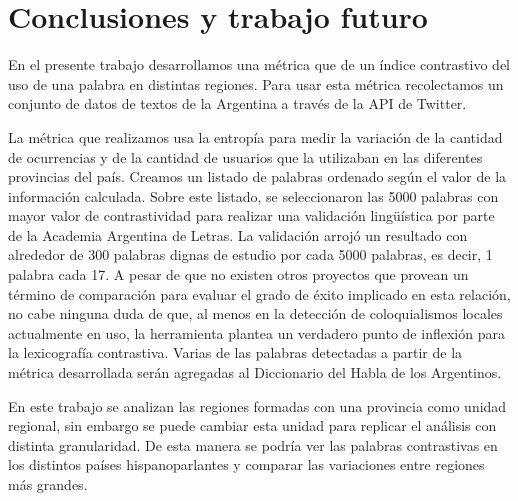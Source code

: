 \section{Conclusiones y trabajo futuro}
En el presente trabajo desarrollamos una métrica que de un índice contrastivo del uso de una palabra en distintas regiones. Para usar esta métrica recolectamos un conjunto de datos de textos de la Argentina a través de la API de Twitter.

La métrica que realizamos usa la entropía para medir la variación de la cantidad de ocurrencias y de la cantidad de usuarios que la utilizaban en las diferentes provincias del país. Creamos un listado de palabras ordenado según el valor de la información calculada. 
Sobre este listado, se seleccionaron las 5000 palabras con mayor valor de contrastividad para realizar una validación lingüística por parte de la Academia Argentina de Letras. La validación arrojó un resultado con alrededor de 300 palabras dignas de estudio por cada 5000 palabras, es decir, 1 palabra cada 17. 
A pesar de que no existen otros proyectos que provean un término de comparación para evaluar el grado de éxito implicado en esta relación, no cabe ninguna duda de que, al menos en la detección de coloquialismos locales actualmente en uso, la herramienta plantea un verdadero punto de inflexión para la lexicografía contrastiva.
Varias de las palabras detectadas a partir de la métrica desarrollada serán agregadas al Diccionario del Habla de los Argentinos.

En este trabajo se analizan las regiones formadas con una provincia como unidad regional, sin embargo se puede cambiar esta unidad para replicar el análisis con distinta granularidad. De esta manera se podría ver las palabras contrastivas en los distintos países hispanoparlantes y comparar las variaciones entre regiones más grandes.



